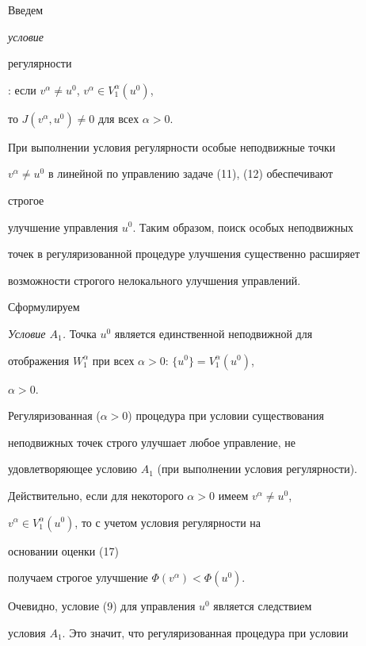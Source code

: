 


Введем {\it условие 


регулярности}\/: если $v^\alpha\ne u^0$, $v^\alpha\in V^\alpha_1(u^0)$, 


то $J(v^\alpha,u^0)\ne0$ для всех $\alpha>0$. 


При выполнении условия регулярности особые неподвижные точки 


$v^\alpha\ne u^0$ в линейной по управлению задаче (11), (12) обеспечивают 


строгое 


улучшение управления $u^0$. Таким образом, поиск особых неподвижных 


точек в регуляризованной процедуре улучшения существенно расширяет 


возможности строгого нелокального улучшения управлений. 


 


Сформулируем 


\medskip 


 


{\it Условие $A_1$.} Точка $u^0$ является единственной неподвижной для 


отображения $W^\alpha_1$ при всех $\alpha>0$: $\{u^0\}=V^\alpha_1(u^0)$, 


$\alpha>0$. 


\medskip 


 


Регуляризованная ($\alpha>0$) процедура при условии существования 


неподвижных точек строго улучшает любое управление, не 


удовлетворяющее условию $A_1$ (при выполнении условия регулярности). 


Действительно, если для некоторого $\alpha>0$ имеем $v^\alpha\ne u^0$, 


$v^\alpha\in V^\alpha_1(u^0)$, то с учетом условия регулярности на 


основании оценки (17) 


получаем строгое улучшение $\Phi(v^\alpha)<\Phi(u^0)$. 


 


Очевидно, условие (9) для управления $u^0$ является следствием 


условия $A_1$. Это значит, что регуляризованная процедура при условии 


